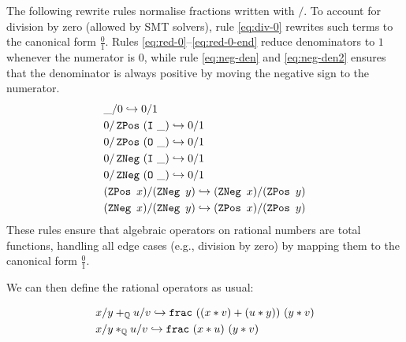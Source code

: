 \begin{definition}
The following rewrite rules normalise fractions written with $\slash$.
To account for division by zero (allowed by SMT solvers), rule \cref{eq:div-0} rewrites such terms to the canonical form $\tfrac{0}{1}$.
Rules \cref{eq:red-0}–\cref{eq:red-0-end} reduce denominators to $1$ whenever the numerator is $0$, while rule \cref{eq:neg-den} and \cref{eq:neg-den2} ensures that the denominator is always positive by moving the negative sign to the numerator.
\begin{align}
& \_ \slash 0 \hookrightarrow 0 \slash 1 \label{eq:div-0}\\
& 0 \slash \mathop{\texttt{ZPos}}~(\texttt{\upshape{I}}~\_) \hookrightarrow 0 \slash 1 \label{eq:red-0}\\
& 0 \slash \mathop{\texttt{ZPos}}~(\texttt{\upshape{O}}~\_) \hookrightarrow 0 \slash 1 \\
& 0 \slash \mathop{\texttt{ZNeg}}~(\texttt{\upshape{I}}~\_) \hookrightarrow 0 \slash 1 \\
& 0 \slash \mathop{\texttt{ZNeg}}~(\texttt{\upshape{O}}~\_) \hookrightarrow 0 \slash 1 \label{eq:red-0-end}\\
& (\mathop{\texttt{ZPos}}~x) \slash (\mathop{\texttt{ZNeg}}~y) \hookrightarrow (\mathop{\texttt{ZNeg}}~x) \slash (\mathop{\texttt{ZPos}}~y) \label{eq:neg-den}\\
& (\mathop{\texttt{ZNeg}}~x) \slash (\mathop{\texttt{ZNeg}}~y) \hookrightarrow (\mathop{\texttt{ZPos}}~x) \slash (\mathop{\texttt{ZPos}}~y) \label{eq:neg-den2}
\end{align}
These rules ensure that algebraic operators on rational numbers are total functions, handling all edge cases (e.g., division by zero) by mapping them to the canonical form $\frac{0}{1}$.
\end{definition}

We can then define the rational operators as usual:

\begin{definition}\label{def:ops-frac}
\begin{align}
&x \slash y +_{\mathbb{Q}} u \slash v \hookrightarrow \texttt{\upshape{frac}}~((x * v) + (u * y))~(y * v) \\
&x \slash y *_{\mathbb{Q}} u \slash v \hookrightarrow \texttt{\upshape{frac}}~(x * u)~(y * v)
\end{align}
\end{definition}




